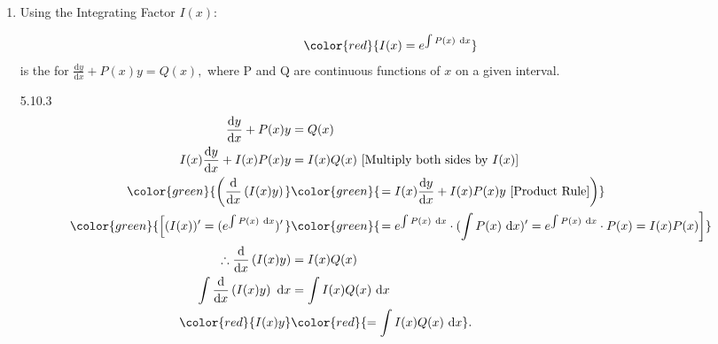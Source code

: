 \documentclass[12pt, a4paper]{article}
\def\d{{\mathrm{d}}}
\begin{document}
\begin{enumerate}
\begin{example}{5.10.3}{}
        \textbf{Solve for $\frac{\d y}{\d x}=\frac{x+y}{x}$.}\\
        \noindent\rule[0.1pt]{\textwidth}{1pt}
        $$\frac{\d y}{\d x}=1+\frac{y}{x}\ \rightarrow\ \text{homogenous differential equation}$$
        $$\text{Assume }v=\frac{y}{x}:\ y=vx\ \Rightarrow\ \frac{\d y}{\d x}=\frac{\d v}{\d x}x+v.$$
        $$\begin{aligned}
            \frac{\d y}{\d x}=1+v&=\frac{\d v}{\d x}x+v\\
            \d v&=\frac{1}{x}\ \d x\\
            \int\ \d v&=\int \frac{1}{x}\ \d x\\
            v&=\ln|x|+C=\ln|Ax|\\
            \frac{y}{x}&=\ln|Ax|\\
            y&=x\ln|Ax|.
        \end{aligned}$$ 
    \end{example}
    \item Using the Integrating Factor $I(x)$: 
    \begin{myclaim}{ }{}
        $${\color{red}{I(x)=e^{\int P(x)\ \d x}}}$$
        is the \textbf{\color{red}{integrating factor}} for $\frac{\d y}{\d x}+P(x)y=Q(x),$ where P and Q are continuous functions of $x$ on a given interval. 
    \end{myclaim}
    \begin{theorem}{5.10.3}{}
        $$\begin{aligned}
            \frac{\d y}{\d x}+P(x)y&=Q(x)\\
            I(x)\frac{\d y}{\d x}+I(x)P(x)y&=I(x)Q(x)\ [\text{Multiply both sides by }I(x)]\\
            {\color{green}{\left(\frac{\d}{\d x}\left(I(x)y\right)\right.}}&{\color{green}{\left.=I(x)\frac{\d y}{\d x}+I(x)P(x)y\ [\text{Product Rule}]\right)}}\\
            {\color{green}{\left[(I(x))'=(e^{\int P(x)\ \d x})'\right.}}&{\color{green}{\left.=e^{\int P(x)\ \d x}\cdot (\int P(x)\ \d x)'=e^{\int P(x)\ \d x}\cdot P(x)=I(x)P(x)\right]}}\\
            \therefore \frac{\d}{\d x}\left(I(x)y\right)&=I(x)Q(x)\\
            \int \frac{\d}{\d x}\left(I(x)y\right)\ \d x&=\int I(x)Q(x)\ \d x\\
            {\color{red}{I(x)y}}&{\color{red}{=\int I(x)Q(x)\ \d x}}.
        \end{aligned}$$
    \end{theorem}

\end{enumerate}
\end{document}
